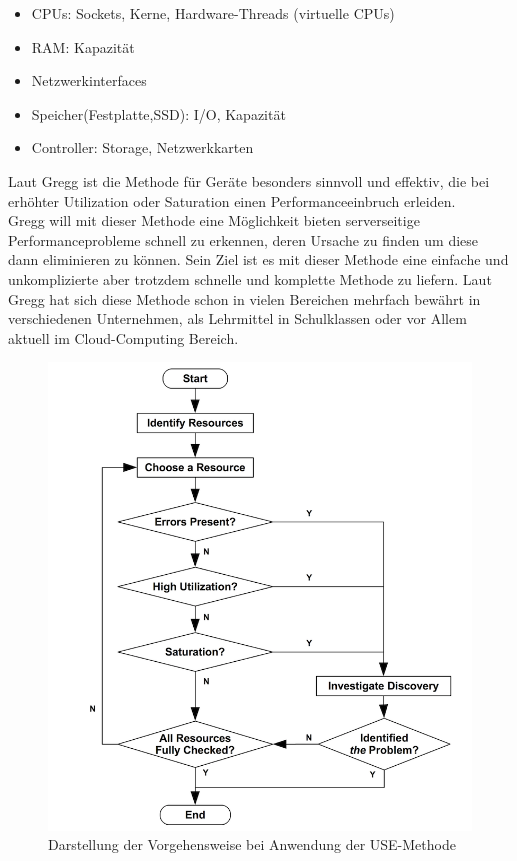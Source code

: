\documentclass[a4paper,10pt]{scrartcl}
\begin{document}
\begin{itemize}
\item CPUs: Sockets, Kerne, Hardware-Threads (virtuelle CPUs)
\item RAM: Kapazität
\item Netzwerkinterfaces
\item Speicher(Festplatte,SSD): I/O, Kapazität
\item Controller: Storage, Netzwerkkarten
\end{itemize}

Laut Gregg ist die Methode für Geräte besonders sinnvoll und effektiv, die bei erhöhter Utilization oder Saturation einen Performanceeinbruch erleiden.\\

Gregg will mit dieser Methode eine Möglichkeit bieten serverseitige Performanceprobleme schnell zu erkennen, deren Ursache zu finden um diese dann eliminieren zu können. Sein Ziel ist es mit dieser Methode eine einfache und unkomplizierte aber trotzdem schnelle und komplette Methode zu liefern. Laut Gregg hat sich diese Methode schon in vielen Bereichen mehrfach bewährt in verschiedenen Unternehmen, als Lehrmittel in Schulklassen oder vor Allem aktuell im Cloud-Computing Bereich.\\

\begin{figure}[htbp]
\includegraphics[scale=.7]{img/usemethod_flow.png}
\caption{Darstellung der Vorgehensweise bei Anwendung der USE-Methode}
\end{figure}
\end{document}
